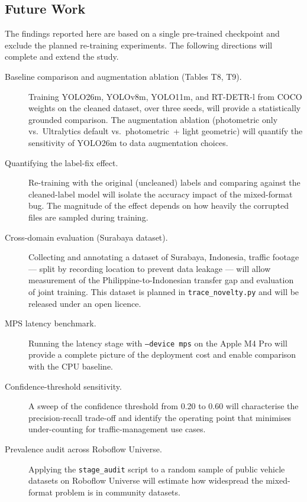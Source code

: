 \subsection*{Future Work}

The findings reported here are based on a single pre-trained checkpoint
and exclude the planned re-training experiments.
The following directions will complete and extend the study.

\begin{description}

  \item[Baseline comparison and augmentation ablation (Tables T8, T9).]
    Training YOLO26m, YOLOv8m, YOLO11m, and RT-DETR-l from COCO weights
    on the cleaned dataset, over three seeds, will provide a statistically
    grounded comparison.
    The augmentation ablation (photometric only vs.\ Ultralytics default
    vs.\ photometric~+ light geometric) will quantify the sensitivity of
    YOLO26m to data augmentation choices.

  \item[Quantifying the label-fix effect.]
    Re-training with the original (uncleaned) labels and comparing against
    the cleaned-label model will isolate the accuracy impact of the
    mixed-format bug.
    The magnitude of the effect depends on how heavily the corrupted files
    are sampled during training.

  \item[Cross-domain evaluation (Surabaya dataset).]
    Collecting and annotating a dataset of Surabaya, Indonesia, traffic
    footage — split by recording location to prevent data leakage — will
    allow measurement of the Philippine-to-Indonesian transfer gap and
    evaluation of joint training.
    This dataset is planned in \texttt{trace\_novelty.py} and will be
    released under an open licence.

  \item[MPS latency benchmark.]
    Running the latency stage with \texttt{--device mps} on the Apple M4
    Pro will provide a complete picture of the deployment cost and
    enable comparison with the CPU baseline.

  \item[Confidence-threshold sensitivity.]
    A sweep of the confidence threshold from 0.20 to 0.60 will
    characterise the precision-recall trade-off and identify the
    operating point that minimises under-counting for traffic-management
    use cases.

  \item[Prevalence audit across Roboflow Universe.]
    Applying the \texttt{stage\_audit} script to a random sample of
    public vehicle datasets on Roboflow Universe will estimate how
    widespread the mixed-format problem is in community datasets.

\end{description}


